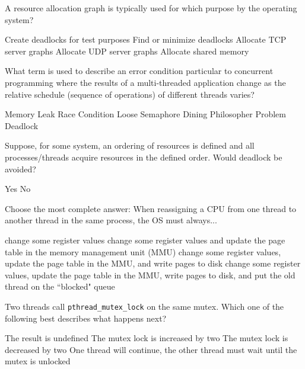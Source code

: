 \variant
A resource allocation graph is typically used for which purpose by the operating system?
\begin{answers}
\answer Create deadlocks for test purposes
\correctanswer Find or minimize deadlocks
\answer Allocate TCP server graphs
\answer Allocate UDP server graphs
\answer Allocate shared memory
\end{answers}
\begin{solution}
\end{solution}

\variant
What term is used to describe an error condition particular to concurrent programming where the results of a multi-threaded application change as the relative schedule (sequence of operations) of different threads varies?
\begin{answers}
\answer Memory Leak
\correctanswer Race Condition
\answer Loose Semaphore
\answer Dining Philosopher Problem
\answer Deadlock
\end{answers}
\begin{solution}
\end{solution}


\variant
Suppose, for some system, an ordering of resources is defined and all processes/threads acquire resources in the defined order. Would deadlock be avoided?
\begin{answers}
\correctanswer Yes
\answer No
\end{answers}
\begin{solution}
\end{solution}


\variant
Choose the most complete answer:  When reassigning a CPU from one thread to another thread in the same process, the OS must always...
\begin{answers}
\correctanswer change some register values
\answer change some register values and update the page table in the memory management unit (MMU)
\answer change some register values, update the page table in the MMU, and write pages to disk
\answer change some register values, update the page table in the MMU, write pages to disk, and put the old thread on the ``blocked" queue
\end{answers}
\begin{solution}
\end{solution}


\variant
Two threads call {\tt pthread_mutex_lock} on the same mutex. Which one of the following best describes what happens next?
\begin{answers}
\answer The result is undefined
\answer The mutex lock is increased by two
\answer The mutex lock is decreased by two
\correctanswer One thread will continue, the other thread must wait until the mutex is unlocked
\end{answers}
\begin{solution}
\end{solution}


